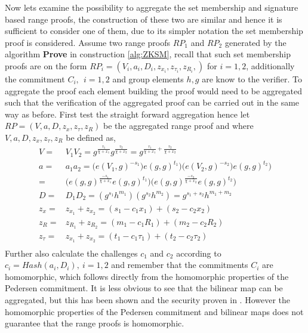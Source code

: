 Now lets examine the possibility to aggregate the set membership and signature based range proofs, the construction of these two are similar and hence it is sufficient to consider one of them, due to  its simpler notation the set membership proof is considered. Assume two range proofs $RP_1$ and $RP_2$ generated by the algorithm \textbf{Prove} in construction \ref{alg:ZKSM}, recall that such set membership proofs are on the form $RP_i = (V_i,a_i,D_i,z_{x_i},z_{\tau _i},z_{R_i}, )$ for $i=1,2$,  additionally the commitment $C_i, \:\: i=1,2$ and group elements $h,g$ are know to the verifier. To aggregate the proof each element building the proof would need to be aggregated such that the verification of the aggregated proof can be carried out in the same way as before. First test the straight forward aggregation hence let $RP = (V,a,D,z_{x},z_{\tau },z_{R})$ be the aggregated range proof and  where $V, a, D,z_{x},z_{\tau },z_{R}$ be defined as,
\begin{equation}
\begin{aligned}
\label{eq:naiveAgg}
V =& V_1V_2 = g^{\frac{\tau_1}{\chi + x_1}}g^{\frac{\tau_2}{\chi + x_2}}  = g^{\frac{\tau_1}{\chi + x_1} + \frac{\tau_2}{\chi + x_2}}  \\
a =& a_1a_2 = \big(e(V_1,g)^{-s_1})e(g,g)^{t_1}\big)  \big(e(V_2,g)^{-s_2})e(g,g)^{t_2}\big) \\
=&  \big( e(g,g)^{\frac{-s_1}{\chi+x_1}}e(g,g)^{t_1}\big) \big( e(g,g)^{\frac{-s_2}{\chi+x_2}}e(g,g)^{t_2}\big) \\
D =& D_1D_2 = ( g^{s_1}h^{m_1} ) (g^{s_2} h^{m_2}) = g^{s_1+s_2}h^{m_1+m_2}\\
z_x =& z_{x_1} + z_{x_2} = (s_1-c_1x_1)+(s_2-c_2x_2)\\
z_R =& z_{R_1} + z_{R_2} = (m_1-c_1R_1)+(m_2-c_2R_2)\\
z_\tau =& z_{x_1} + z_{x_2} = (t_1-c_1\tau_1)+(t_2-c_2\tau_2)\\ 
\end{aligned} 
\end{equation}
Further also calculate the challenges $c_1$ and $c_2$ according to $c_i=Hash(a_i,D_i),\: i=1,2$ and remember that the  commitments $C_i$  are homomorphic, which  follows directly from the homomorphic properties of the Pedersen commitment. It is less obvious to see that the bilinear map can be aggregated, but this has been shown and the security proven in \cite{aggregate_bm}. However the homomorphic properties of the Pedersen commitment and bilinear maps does not guarantee that the range proofs is homomorphic. 


